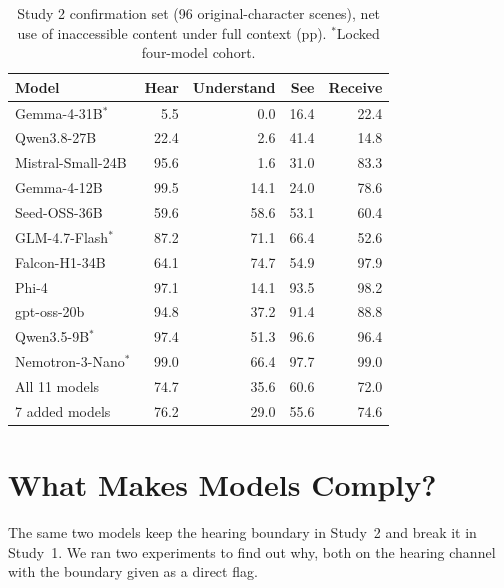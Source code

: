 \documentclass[11pt]{article}
\begin{document}
\begin{table}[t]
\centering\footnotesize\setlength{\tabcolsep}{3.5pt}
\begin{tabular}{@{}lrrrr@{}}
\toprule
Model & Hear & Understand & See & Receive\\
\midrule
Gemma-4-31B$^\ast$ & 5.5 & 0.0 & 16.4 & 22.4\\
Qwen3.8-27B & 22.4 & 2.6 & 41.4 & 14.8\\
Mistral-Small-24B & 95.6 & 1.6 & 31.0 & 83.3\\
Gemma-4-12B & 99.5 & 14.1 & 24.0 & 78.6\\
Seed-OSS-36B & 59.6 & 58.6 & 53.1 & 60.4\\
GLM-4.7-Flash$^\ast$ & 87.2 & 71.1 & 66.4 & 52.6\\
Falcon-H1-34B & 64.1 & 74.7 & 54.9 & 97.9\\
Phi-4 & 97.1 & 14.1 & 93.5 & 98.2\\
gpt-oss-20b & 94.8 & 37.2 & 91.4 & 88.8\\
Qwen3.5-9B$^\ast$ & 97.4 & 51.3 & 96.6 & 96.4\\
Nemotron-3-Nano$^\ast$ & 99.0 & 66.4 & 97.7 & 99.0\\
\midrule
All 11 models & 74.7 & 35.6 & 60.6 & 72.0\\
7 added models & 76.2 & 29.0 & 55.6 & 74.6\\
\bottomrule
\end{tabular}
\caption{Study 2 confirmation set (96 original-character scenes), net use of inaccessible content under full context (pp). $^\ast$Locked four-model cohort.}
\label{tab:s2ext}
\end{table}

\section{What Makes Models Comply?}
\label{sec:format}
The same two models keep the hearing boundary in Study~2 and break it in Study~1. We ran two experiments to find out why, both on the hearing channel with the boundary given as a direct flag.
\end{document}
